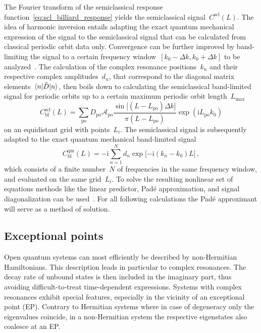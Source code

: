 \documentclass[doublecol]{epl2}
\newcommand{\ii}{\mathrm{i}}
\begin{document}
The Fourier transform of the semiclassical response function~\eqref{eq:scl_billiard_response} yields the semiclassical signal~$C^\mathrm{scl}(L)$. The idea of harmonic inversion entails adapting the exact quantum mechanical expression of the signal to the semiclassical signal that can be calculated from classical periodic orbit data only. Convergence can be further improved by band-limiting the signal to a certain frequency window~$[k_0 - \Delta k, k_0 + \Delta k]$ to be analyzed~\cite{wall_extraction_1995,mandelshtam_spectral_1997,mandelshtam_harmonic_1997,main_decimation_2000}. The calculation of the complex resonance positions~$k_n$ and their respective complex amplitudes~$d_n$, that correspond to the diagonal matrix elements~$\braket{n|\hat{D}|n}$, then boils down to calculating the semiclassical band-limited signal for periodic orbits up to a certain maximum periodic orbit length~$L_\mathrm{max}$
\begin{equation}
  C^\mathrm{scl}_\mathrm{bl}(L) = \sum_\mathrm{po} D_\mathrm{po} \mathcal{A}_\mathrm{po} \frac{\sin\big[ (L - L_\mathrm{po}) \Delta k \big]}{\pi(L - L_\mathrm{po})} \exp(\ii L_\mathrm{po} k_0)
  \label{eq:scl_signal}
\end{equation}
on an equidistant grid with points~$L_i$. The semiclassical signal is subsequently adapted to the exact quantum mechanical band-limited signal
\begin{equation}
  C^\mathrm{qm}_\mathrm{bl}(L) = -\ii \sum_{n=1}^N d_n \exp\big[{-\ii} (k_n - k_0) L \big]\,,
  \label{eq:qm_signal}
\end{equation}
which consists of a finite number~$N$ of frequencies in the same frequency window, and evaluated on the same grid~$L_i$. To solve the resulting nonlinear set of equations methods like the linear predictor, Padé approximation, and signal diagonalization can be used~\cite{main_decimation_2000}. For all following calculations the Padé approximant will serve as a method of solution.

\subsection{Exceptional points}
Open quantum systems can most efficiently be described by non-Hermitian Hamiltonians. This description leads in particular to complex resonances. The decay rate of unbound states is then included in the imaginary part, thus avoiding difficult-to-treat time-dependent expressions. Systems with complex resonances exhibit special features, especially in the vicinity of an exceptional point (EP). Contrary to Hermitian systems where in case of degeneracy only the eigenvalues coincide, in a non-Hermitian system the respective eigenstates also coalesce at an EP.
\end{document}
